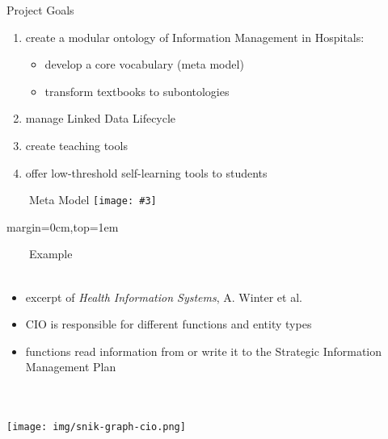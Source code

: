 \documentclass[aspectratio=1610,12pt]{beamer}
\newcommand{\imageslide}[4][]
{
\newgeometry{margin=0cm,top=1em}
\begin{frame}[plain]{~~~~#2}
\centering\texttt{[image: \#3]}
\\#1
\note{#4}
\end{frame}
\restoregeometry
}
\begin{document}
\begin{frame}{Project Goals}
\begin{enumerate}
\item create a modular ontology of Information Management in Hospitals:
\begin{itemize}
\item develop a core vocabulary (meta model)
\item transform textbooks to subontologies 
\end{itemize}
\item manage Linked Data Lifecycle 
\item create teaching tools
\item offer low-threshold self-learning tools to students
\end{enumerate}
\end{frame}


\imageslide{Meta Model}{img/metamodel9s.pdf}

\newgeometry{margin=0cm,top=1em}
\begin{frame}[plain]{~~~~Example}
~\\~\\
\begin{itemize}
\item excerpt of \emph{Health Information Systems}, A. Winter et al.
\item CIO is responsible for different functions and entity types
\item functions read information from or write it to the Strategic Information Management Plan
\end{itemize}
~\\~\\
\centering\texttt{[image: img/snik-graph-cio.png]}
\end{frame}
\restoregeometry
\end{document}
